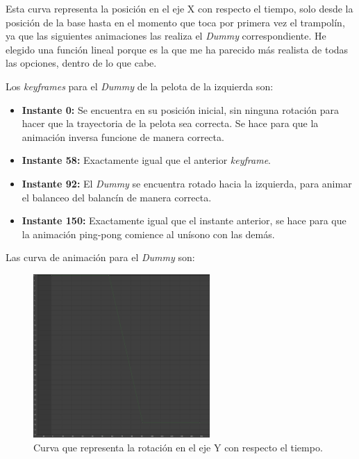 Esta curva representa la posición en el eje X con respecto el tiempo, solo desde la posición de la base hasta en el momento que toca por primera vez el trampolín, ya que las siguientes animaciones las realiza el \textit{Dummy} correspondiente. He elegido una función lineal porque es la que me ha parecido más realista de todas las opciones, dentro de lo que cabe. 

\bigskip

Los \textit{keyframes} para el \textit{Dummy} de la pelota de la izquierda son:

\begin{itemize}
    \item \textbf{Instante 0: }Se encuentra en su posición inicial, sin ninguna rotación para hacer que la trayectoria de la pelota sea correcta. Se hace para que la animación inversa funcione de manera correcta.
    \item \textbf{Instante 58: }Exactamente igual que el anterior \textit{keyframe}.
    \item \textbf{Instante 92: }El \textit{Dummy} se encuentra rotado hacia la izquierda, para animar el balanceo del balancín de manera correcta.
    \item \textbf{Instante 150: }Exactamente igual que el instante anterior, se hace para que la animación ping-pong comience al unísono con las demás.
\end{itemize}

\newpage

Las curva de animación para el \textit{Dummy} son:

\begin{figure}[H]
    \centering
    \includegraphics[width=0.6\textwidth]{imagenes/curvas/PL/dummy/green.png}
    \caption{Curva que representa la rotación en el eje Y con respecto el tiempo.}
 \end{figure}

